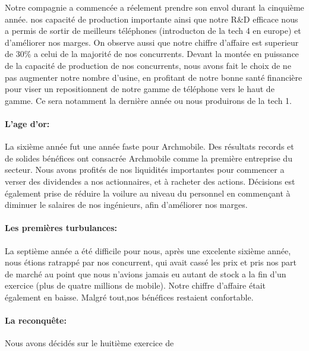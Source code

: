 Notre compagnie a commencée a réelement prendre son envol durant la cinquième année. nos capacité de production importante ainsi que notre R\&D efficace nous a permis de sortir de meilleurs téléphones (introducton de la tech 4 en europe) et d'améliorer nos marges. On observe aussi que notre chiffre d'affaire est superieur de 30\% a celui de la majorité de nos concurrents. Devant la montée en puissance de la capacité de production de nos concurrents, nous avons fait le choix de ne pas augmenter notre nombre d'usine, en profitant de notre bonne santé financière pour viser un repositionnent de notre gamme de téléphone vers le haut de gamme. Ce sera notamment la dernière année ou nous produirons de la tech 1.

\paragraph{L'age d'or:}

La sixième année fut une année faste pour Archmobile. Des résultats
records et de solides bénéfices ont consacrée Archmobile comme la
première entreprise du secteur. Nous avons profités de nos liquidités
importantes pour commencer a verser des dividendes a nos actionnaires,
et à racheter des actions. Décisions est également prise de réduire la
voilure au niveau du personnel en commençant à diminuer le salaires de
nos ingénieurs, afin d'améliorer nos marges.

\paragraph{Les premières turbulances:}

La septième année a été difficile pour nous, après une excelente
sixième année, nous étions ratrappé par nos concurrent, qui avait
cassé les prix et pris nos part de marché au point que nous n'avions
jamais eu autant de stock a la fin d'un exercice (plus de quatre
millions de mobile). Notre chiffre d'affaire était également en baisse.
Malgré tout,nos bénéfices restaient confortable.

\paragraph{La reconquête:}
 
Nous avons décidés sur le huitième exercice de 

